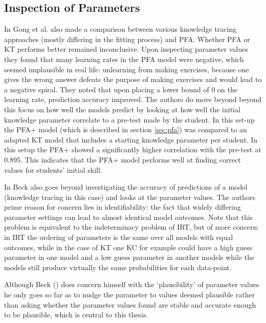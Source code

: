 \documentclass{scrartcl}
\begin{document}
\subsection{Inspection of Parameters}
In \cite{ktpfa} Gong et al. also made a comparison between various knowledge tracing approaches (mostly differing in the fitting process) and PFA. Whether PFA or KT performs better remained inconclusive. Upon inspecting parameter values they found that many learning rates in the PFA model were negative, which seemed implausible in real life: unlearning from making exercises, because one gives the wrong answer defeats the purpose of making exercises and would lead to a negative spiral. They noted that upon placing a lower bound of 0 on the learning rate, prediction accuracy improved. The authors do move beyond beyond this focus on how well the models predict by looking at how well the initial knowledge parameter correlate to a pre-test made by the student. In this set-up the PFA+ model (which is described in section \ref{sec:pfa}) was compared to an adapted KT model that includes a starting knowledge parameter per student. In this setup the PFA+ showed a significantly higher correlation with the pre-test at 0.895. This indicates that the PFA+ model performs well at finding correct values for students' initial skill.

In \cite{knowledgeproblem} Beck also goes beyond investigating the accuracy of predictions of a model (knowledge tracing in this case) and looks at the parameter values. The authors prime reason for concern lies in identifiability: the fact that widely differing parameter settings can lead to almost identical model outcomes. Note that this problem is equivalent to the indeterminacy problem of IRT, but of more concern: in IRT the ordering of parameters is the same over all models with equal outcomes, while in the case of KT one KC for example could have a high guess parameter in one model and a low guess parameter in another models while the models still produce virtually the same probabilities for each data-point. 

Although Beck (\cite{knowledgeproblem}) does concern himself with the `plausibility' of parameter values he only goes so far as to nudge the parameter to values deemed plausible rather than asking whether the parameter values found are stable and accurate enough to be plausible, which is central to this thesis.
\end{document}
